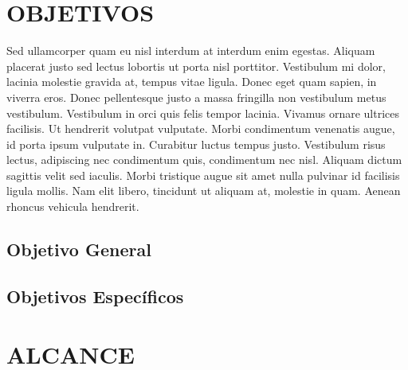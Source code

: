 


\section{OBJETIVOS}

Sed ullamcorper quam eu nisl interdum at interdum enim egestas. Aliquam placerat justo sed lectus lobortis ut porta nisl porttitor. Vestibulum mi dolor, lacinia molestie gravida at, tempus vitae ligula. Donec eget quam sapien, in viverra eros. Donec pellentesque justo a massa fringilla non vestibulum metus vestibulum. Vestibulum in orci quis felis tempor lacinia. Vivamus ornare ultrices facilisis. Ut hendrerit volutpat vulputate. Morbi condimentum venenatis augue, id porta ipsum vulputate in. Curabitur luctus tempus justo. Vestibulum risus lectus, adipiscing nec condimentum quis, condimentum nec nisl. Aliquam dictum sagittis velit sed iaculis. Morbi tristique augue sit amet nulla pulvinar id facilisis ligula mollis. Nam elit libero, tincidunt ut aliquam at, molestie in quam. Aenean rhoncus vehicula hendrerit.

\subsection{Objetivo General}

\subsection{Objetivos Específicos}


\section{ALCANCE}